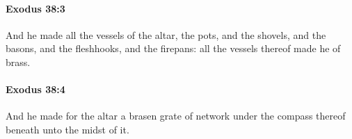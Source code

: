 		\paragraph{Exodus 38:3} %
			\label{EXODUS-38-3}

			And he made all the vessels of the altar, the pots, and the shovels, and the basons, and the fleshhooks, and the firepans: all the vessels thereof made he of brass.


		\paragraph{Exodus 38:4} %
			\label{EXODUS-38-4}

			And he made for the altar a brasen grate of network under the compass thereof beneath unto the midst of it.


